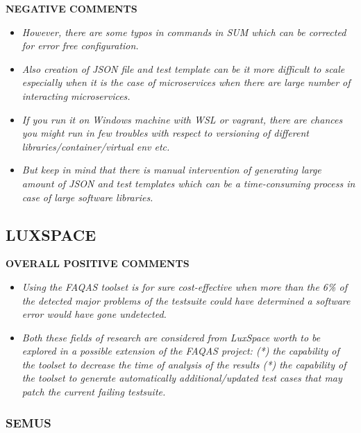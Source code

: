 \textbf{NEGATIVE  COMMENTS}  
\begin{itemize}
\item \emph{However, there are some typos in commands in SUM which can be corrected for error free configuration.} 

 

\item \emph{Also creation of JSON file and test template can be it more difficult to scale especially when it is the case of microservices when there are large number of interacting microservices.} 

 

\item \emph{If you run it on Windows machine with WSL or vagrant, there are chances you might run in few troubles with respect to versioning of different libraries/container/virtual env etc.} 

 

\item \emph{But keep in mind that there is manual intervention of generating large amount of JSON and test templates which can be a time-consuming process in case of large software libraries.} 
\end{itemize}
 
\subsection{LUXSPACE}



\textbf{OVERALL POSITIVE COMMENTS} 

 

 
\begin{itemize}
\item \emph{Using the FAQAS toolset is for sure cost-effective when more than the 6\% of the detected major problems of the testsuite could have determined a software error would have gone undetected. }

 

\item \emph{Both these fields of research are considered from LuxSpace worth to be explored in a possible extension of the FAQAS project: 
(*) the capability of the toolset to decrease the time of analysis of the results (*) the capability of the toolset to generate automatically additional/updated test cases that may patch the current failing testsuite.} 
\end{itemize}
 
\subsubsection{SEMUS} \ \\ 


